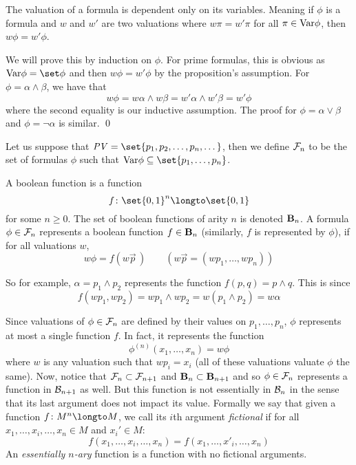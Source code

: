 \bprop

    The valuation of a formula is dependent only on its variables.
    Meaning if $\phi$ is a formula and $w$ and $w'$ are two valuations where $w\pi=w'\pi$ for all $\pi\in{\rm Var}\phi$, then $w\phi=w'\phi$.

\eprop

We will prove this by induction on $\phi$.
For prime formulas, this is obvious as $\Var\phi=\set\phi$ and then $w\phi=w'\phi$ by the proposition's assumption.
For $\phi=\alpha\land\beta$, we have that
$$ w\phi = w\alpha\land w\beta = w'\alpha\land w'\beta = w'\phi $$
where the second equality is our inductive assumption.
The proof for $\phi=\alpha\lor\beta$ and $\phi=\neg\alpha$ is similar.
\qed

Let us suppose that $\PV=\set{p_1,p_2,\dots,p_n,\dots}$, then we define ${\cal F}_n$ to be the set of formulas $\phi$ such that $\Var\phi\subseteq\set{p_1,\dots,p_n}$.

\bdefn

    A {\emphcolor boolean function} is a function
    $$ f\colon\set{0,1}^n\longto\set{0,1} $$
    for some $n\geq0$.
    The set of boolean functions of arity $n$ is denoted ${\bf B}_n$.
    A formula $\phi\in{\cal F}_n$ {\emphcolor represents} a boolean function $f\in{\bf B}_n$ (similarly, $f$ is represented by $\phi$), if for all valuations $w$,
    $$ w\phi = f(w\vec p\,) \qquad (w\vec p=(wp_1,\dots,wp_n)) $$

\edefn

So for example, $\alpha=p_1\land p_2$ represents the function $f(p,q)=p\land q$.
This is since
$$ f(wp_1,wp_2) = wp_1\land wp_2 = w(p_1\land p_2) = w\alpha $$

Since valuations of $\phi\in{\cal F}_n$ are defined by their values on $p_1,\dots,p_n$, $\phi$ represents at most a single function $f$.
In fact, it represents the function
$$ \phi^{(n)}(x_1,\dots,x_n) = w\phi $$
where $w$ is any valuation such that $wp_i=x_i$ (all of these valuations valuate $\phi$ the same).
Now, notice that ${\cal F}_n\subset{\cal F}_{n+1}$ and ${\bf B}_n\subset{\bf B}_{n+1}$ and so $\phi\in{\cal F}_n$ represents a function in ${\cal B}_{n+1}$ as well.
But this function is not essentially in ${\cal B}_n$ in the sense that its last argument does not impact its value.
Formally we say that given a function $f\colon M^n\longto M$, we call its $i$th argument {\it fictional} if for all $x_1,\dots,x_i,\dots,x_n\in M$ and $x_i'\in M$:
$$ f(x_1,\dots,x_i,\dots,x_n) = f(x_1,\dots,x'_i,\dots,x_n) $$
An {\it essentially $n$-ary} function is a function with no fictional arguments.

